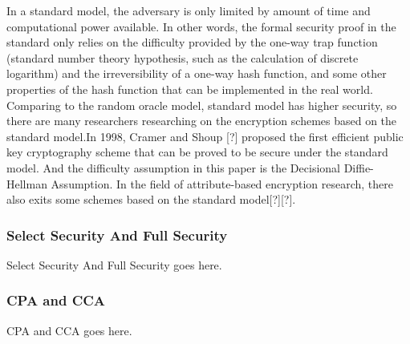In a standard model, the adversary is only limited by amount of time and computational power available. In other words, the formal security proof in the standard only relies on the difficulty provided by the one-way trap function  (standard number theory hypothesis, such as the calculation of discrete logarithm)  and the irreversibility of a one-way hash function, and some other properties of the hash function that can be implemented in the real world. Comparing to the random oracle model, standard model has higher security, so there are many researchers researching on the encryption schemes based on the standard model.In 1998, Cramer and Shoup [?] proposed the first efficient public key cryptography scheme that can be proved to be secure under the standard model. And the difficulty assumption in this paper is the Decisional Diffie-Hellman Assumption. In the field of attribute-based encryption research, there also exits some schemes based on the standard model[?][?].

\subsubsection{Select Security And Full Security}Select Security And Full Security goes here.

\subsubsection{CPA and CCA}CPA and CCA goes here.
